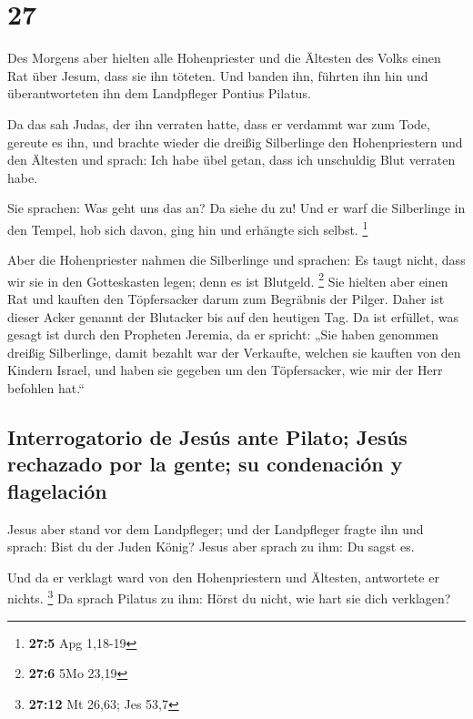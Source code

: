 \hypertarget{section-26}{%
\section{27}\label{section-26}}

 Des Morgens aber hielten alle Hohenpriester und die
Ältesten des Volks einen Rat über Jesum, dass sie ihn töteten.
 Und banden ihn, führten ihn hin und überantworteten ihn
dem Landpfleger Pontius Pilatus.

 Da das sah Judas, der ihn verraten hatte, dass er
verdammt war zum Tode, gereute es ihn, und brachte wieder die dreißig
Silberlinge den Hohenpriestern und den Ältesten  und
sprach: Ich habe übel getan, dass ich unschuldig Blut verraten habe.

 Sie sprachen: Was geht uns das an? Da siehe du zu! Und er
warf die Silberlinge in den Tempel, hob sich davon, ging hin und
erhängte sich selbst. \footnote{\textbf{27:5} Apg 1,18-19}

 Aber die Hohenpriester nahmen die Silberlinge und
sprachen: Es taugt nicht, dass wir sie in den Gotteskasten legen; denn
es ist Blutgeld. \footnote{\textbf{27:6} 5Mo 23,19}  Sie
hielten aber einen Rat und kauften den Töpfersacker darum zum Begräbnis
der Pilger.  Daher ist dieser Acker genannt der Blutacker
bis auf den heutigen Tag.  Da ist erfüllet, was gesagt ist
durch den Propheten Jeremia, da er spricht: „Sie haben genommen dreißig
Silberlinge, damit bezahlt war der Verkaufte, welchen sie kauften von
den Kindern Israel,  und haben sie gegeben um den
Töpfersacker, wie mir der Herr befohlen hat.``

\hypertarget{interrogatorio-de-jesuxfas-ante-pilato-jesuxfas-rechazado-por-la-gente-su-condenaciuxf3n-y-flagelaciuxf3n}{%
\subsection{Interrogatorio de Jesús ante Pilato; Jesús rechazado por la
gente; su condenación y
flagelación}\label{interrogatorio-de-jesuxfas-ante-pilato-jesuxfas-rechazado-por-la-gente-su-condenaciuxf3n-y-flagelaciuxf3n}}

 Jesus aber stand vor dem Landpfleger; und der
Landpfleger fragte ihn und sprach: Bist du der Juden König? Jesus aber
sprach zu ihm: Du sagst es.

 Und da er verklagt ward von den Hohenpriestern und
Ältesten, antwortete er nichts. \footnote{\textbf{27:12} Mt 26,63; Jes
  53,7}  Da sprach Pilatus zu ihm: Hörst du nicht, wie
hart sie dich verklagen?

